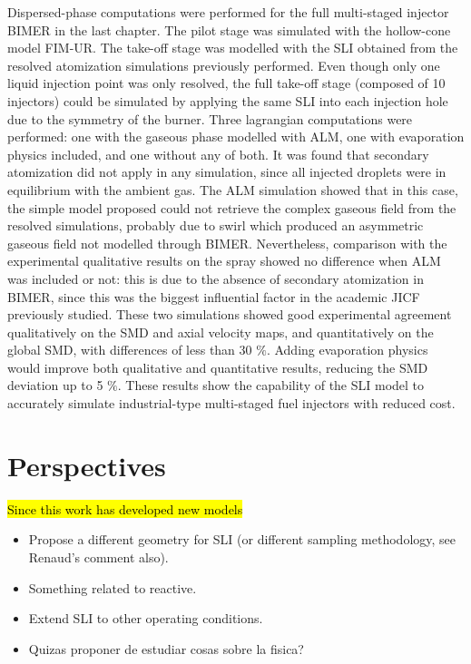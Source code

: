 Dispersed-phase computations were performed for the full multi-staged injector BIMER in the last chapter. The pilot stage was simulated with the hollow-cone model FIM-UR. The take-off stage was modelled with the SLI obtained from the resolved atomization simulations previously performed. Even though only one liquid injection point was only resolved, the full take-off stage (composed of 10 injectors) could be simulated by applying the same SLI into each injection hole due to the symmetry of the burner. Three lagrangian computations were performed: one with the gaseous phase modelled with ALM, one with evaporation physics included, and one without any of both. It was found that secondary atomization did not apply in any simulation, since all injected droplets were in equilibrium with the ambient gas. The ALM simulation showed that in this case, the simple model proposed could not retrieve the complex gaseous field from the resolved simulations, probably due to swirl which produced an asymmetric gaseous field not modelled through BIMER. Nevertheless, comparison with the experimental qualitative results on the spray showed no difference when ALM was included or not: this is due to the absence of secondary atomization in BIMER, since this was the biggest influential factor in the academic JICF previously studied. These two simulations showed good experimental agreement qualitatively on the SMD and axial velocity maps, and quantitatively on the global SMD, with differences of less than 30 $\%$. Adding evaporation physics would improve both qualitative and quantitative results, reducing the SMD deviation up to 5 $\%$. These results show the capability of the SLI model to accurately simulate industrial-type multi-staged fuel injectors with reduced cost.




\section*{Perspectives}

\hl{Since this work has developed new models}

\begin{itemize}

	\item Propose a different geometry for SLI (or different sampling methodology, see Renaud's comment also).
	
	\item Something related to reactive.
	
	\item Extend SLI to other operating conditions.
	
	\item Quizas proponer de estudiar cosas sobre la fisica?

\end{itemize}
